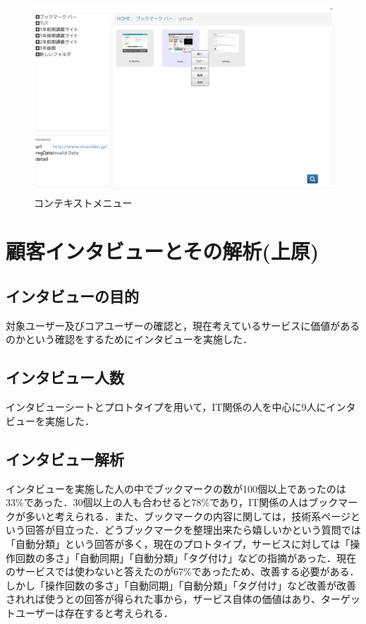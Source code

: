 \documentclass[a4paper,10pt,fleqn]{jsarticle}
\begin{document}
\begin{figure}[h]
  \begin{center}
    \includegraphics[width=14.0cm]{./prot4.png}
    \caption{コンテキストメニュー} 
    \label{fig:prot4}
  \end{center}
\end{figure}

\newpage

\section{顧客インタビューとその解析(上原)}

\subsection{インタビューの目的}
対象ユーザー及びコアユーザーの確認と，現在考えているサービスに価値があるのかという確認をするためにインタビューを実施した．

\subsection{インタビュー人数}
インタビューシートとプロトタイプを用いて，IT関係の人を中心に9人にインタビューを実施した．

\subsection{インタビュー解析}
インタビューを実施した人の中でブックマークの数が100個以上であったのは33\%であった．30個以上の人も合わせると78\%であり，IT関係の人はブックマークが多いと考えられる．また、ブックマークの内容に関しては，技術系ページという回答が目立った．どうブックマークを整理出来たら嬉しいかという質問では「自動分類」という回答が多く，現在のプロトタイプ，サービスに対しては「操作回数の多さ」「自動同期」「自動分類」「タグ付け」などの指摘があった．現在のサービスでは使わないと答えたのが67\%であったため、改善する必要がある．しかし「操作回数の多さ」「自動同期」「自動分類」「タグ付け」など改善が改善されれば使うとの回答が得られた事から，ザービス自体の価値はあり、ターゲットユーザーは存在すると考えられる．
\end{document}
